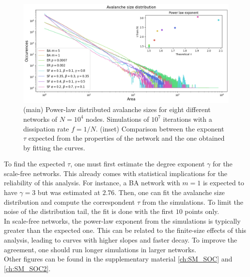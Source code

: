 \begin{figure}[h] 
    \centering
    \includegraphics[width=\textwidth]{images/task15/a_dist.png} 
    \vspace{-1cm}
    \caption{(main) Power-law distributed avalanche sizes for eight different networks of $N=10^4$ nodes. Simulations of $10^7$ iterations with a dissipation rate $f=1/N$. (inset) Comparison between the exponent $\tau$ expected from the properties of the network and the one obtained by fitting the curves.}
    \label{fig:adist} 
\end{figure}

\noindent To find the expected $\tau$, one must first estimate the degree exponent $\gamma$ for the scale-free networks. This already comes with statistical implications for the reliability of this analysis. For instance, a BA network with $m=1$ is expected to have $\gamma = 3$ but was estimated at $2.76$. Then, one can fit the avalanche size distribution and compute the correspondent $\tau$ from the simulations. To limit the noise of the distribution tail, the fit is done with the first $10$ points only. \\
In scale-free networks, the power-law exponent from the simulations is typically greater than the expected one. This can be related to the finite-size effects of this analysis, leading to curves with higher slopes and faster decay. To improve the agreement, one should run longer simulations in larger networks. \\
Other figures can be found in the supplementary material \ref{ch:SM_SOC} and \ref{ch:SM_SOC2}.

 